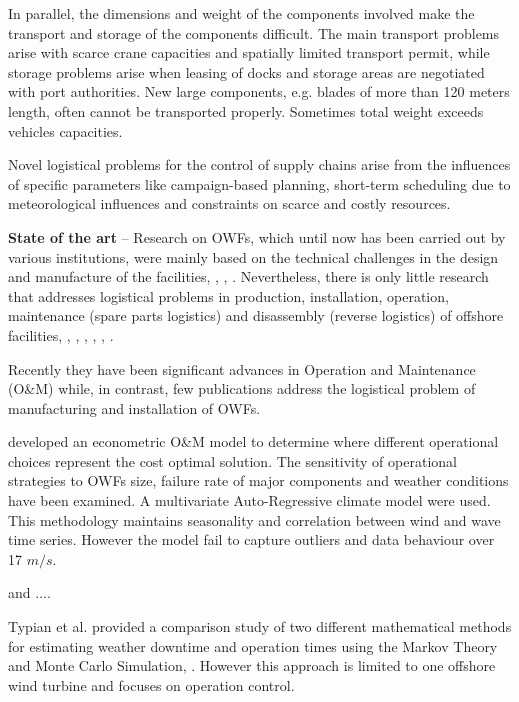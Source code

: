 In parallel, the dimensions and weight of the components involved make the transport and storage of the components difficult. The main transport problems arise with scarce crane capacities and spatially limited transport permit, while storage problems arise when leasing of docks and storage areas are negotiated with port authorities. New large components, e.g. blades of more than 120 meters length, often cannot be transported properly. Sometimes total weight exceeds vehicles capacities.

Novel logistical problems for the control of supply chains arise from the influences of specific parameters like campaign-based planning, short-term scheduling due to meteorological influences and constraints on scarce and costly resources.

\textbf{State of the art} --
Research on OWFs, which until now has been carried out by various institutions, were mainly based on the technical challenges in the design and manufacture of the facilities, \cite{Miller2013}, \cite{SerranoGonzalez2014}, \cite{Perveen2014}. Nevertheless, there is only little research that addresses logistical problems in production, installation, operation, maintenance (spare parts logistics) and disassembly (reverse logistics) of offshore facilities, \cite{Scholz2010}, \cite{Lange2012}, \cite{COMPIT11}, \cite{COMPIT12}, \cite{aitsimulation}, \cite{thalji2012}.

Recently they have been significant advances in Operation and Maintenance (O\&M) while, in contrast, few publications address the logistical problem of manufacturing and installation of OWFs.

\cite{dinwoodie2013} developed an econometric O\&M model to determine where different operational choices represent the cost optimal solution. The sensitivity of operational strategies to OWFs size, failure rate of major components and weather conditions have been examined. A multivariate Auto-Regressive climate model were used. This methodology maintains seasonality and correlation between wind and wave time series. However the model fail to capture outliers and data behaviour over 17 $m/s$.


\cite{Hagen2013} and \cite{scheu2012} ....



Typian et al. provided a comparison study of two different mathematical methods for estimating weather downtime and operation times using the Markov Theory and Monte Carlo Simulation, \cite{Tyapin2011}. However this approach is limited to one offshore wind turbine and focuses on operation control.




